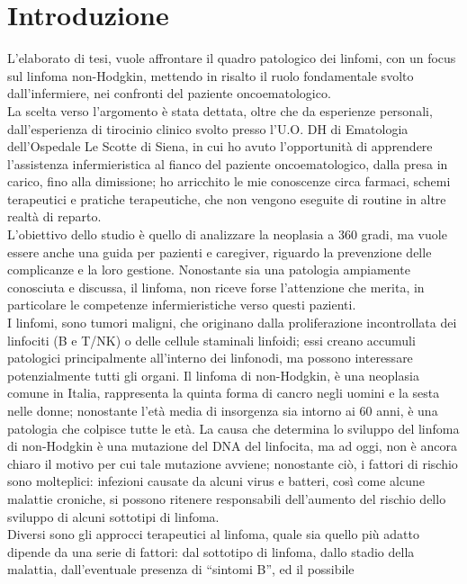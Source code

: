 \section*{Introduzione}
   
L'elaborato di tesi, vuole affrontare il quadro patologico dei linfomi, con un focus sul linfoma non-Hodgkin, 
mettendo in risalto il ruolo fondamentale svolto dall'infermiere, nei confronti del paziente oncoematologico.\\
La scelta verso l'argomento è stata dettata, oltre che da esperienze personali, dall'esperienza di tirocinio clinico 
svolto presso l'U.O. DH di Ematologia dell'Ospedale Le Scotte di Siena, in cui ho avuto l'opportunità di apprendere 
l'assistenza infermieristica al fianco del paziente oncoematologico, dalla presa in carico, fino alla dimissione;
ho arricchito le mie conoscenze circa farmaci, schemi terapeutici e pratiche terapeutiche, 
che non vengono eseguite di routine in altre realtà di reparto.\\ 
L'obiettivo dello studio è quello di analizzare la neoplasia a 360 gradi, ma vuole essere anche 
una guida per pazienti e caregiver, riguardo la prevenzione delle 
complicanze e la loro gestione. Nonostante sia una patologia ampiamente conosciuta e discussa, il linfoma,
non riceve forse l'attenzione che merita, in particolare le competenze infermieristiche verso questi pazienti.\\
I linfomi, sono tumori maligni, che originano dalla proliferazione incontrollata dei linfociti (B e T/NK) o delle 
cellule staminali linfoidi; essi creano accumuli patologici principalmente all’interno dei linfonodi, 
ma possono interessare potenzialmente tutti gli organi.
Il linfoma di non-Hodgkin, è una neoplasia comune in Italia, rappresenta la quinta forma di cancro negli uomini e la 
sesta nelle donne; nonostante l'età media di insorgenza sia intorno ai 60 anni, è una patologia che colpisce tutte 
le età. La causa che determina lo sviluppo del linfoma di non-Hodgkin è una mutazione del DNA del linfocita, ma ad 
oggi, non è ancora chiaro il motivo per cui tale mutazione avviene; nonostante ciò, i fattori di rischio sono 
molteplici:  infezioni causate da alcuni virus e batteri, così come alcune malattie croniche, si possono ritenere 
responsabili dell’aumento del rischio dello sviluppo di alcuni sottotipi di linfoma.\\
Diversi sono gli approcci terapeutici al linfoma, quale sia quello più adatto dipende da una serie di fattori:
dal sottotipo di linfoma, dallo stadio della malattia, dall’eventuale presenza di “sintomi B”, ed il possibile 
